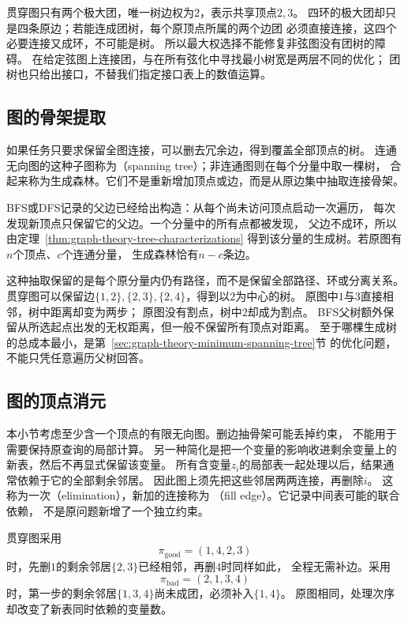 贯穿图只有两个极大团，唯一树边权为\(2\)，表示共享顶点\(2,3\)。
四环的极大团却只是四条原边；若能连成团树，每个原顶点所属的两个边团
必须直接连接，这四个必要连接又成环，不可能是树。
所以最大权选择不能修复非弦图没有团树的障碍。
在给定弦图上连接团，与在所有弦化中寻找最小树宽是两层不同的优化；
团树也只给出接口，不替我们指定接口表上的数值运算。

\subsection{图的骨架提取}
\label{sec:graph-theory-spanning-skeleton}

如果任务只要求保留全图连接，可以删去冗余边，得到覆盖全部顶点的树。
连通无向图的这种子图称为（spanning tree）；非连通图则在每个分量中取一棵树，
合起来称为生成森林。它们不是重新增加顶点或边，而是从原边集中抽取连接骨架。

BFS或DFS记录的父边已经给出构造：从每个尚未访问顶点启动一次遍历，
每次发现新顶点只保留它的父边。一个分量中的所有点都被发现，
父边不成环，所以由定理~\ref{thm:graph-theory-tree-characterizations}
得到该分量的生成树。若原图有\(n\)个顶点、\(c\)个连通分量，
生成森林恰有\(n-c\)条边。

这种抽取保留的是每个原分量内仍有路径，而不是保留全部路径、环或分离关系。
贯穿图可以保留边\(\{1,2\},\{2,3\},\{2,4\}\)，得到以\(2\)为中心的树。
原图中\(1\)与\(3\)直接相邻，树中距离却变为两步；
原图没有割点，树中\(2\)却成为割点。
BFS父树额外保留从所选起点出发的无权距离，但一般不保留所有顶点对距离。
至于哪棵生成树的总成本最小，是第~\ref{sec:graph-theory-minimum-spanning-tree}节
的优化问题，不能只凭任意遍历父树回答。

\subsection{图的顶点消元}
\label{sec:graph-theory-elimination-width}

本小节考虑至少含一个顶点的有限无向图。删边抽骨架可能丢掉约束，
不能用于需要保持原查询的局部计算。
另一种简化是把一个变量的影响收进剩余变量上的新表，然后不再显式保留该变量。
所有含变量\(z_i\)的局部表一起处理以后，结果通常依赖于它的全部剩余邻居。
因此图上须先把这些邻居两两连接，再删除\(i\)。
这称为一次（elimination），新加的连接称为
（fill edge）。它记录中间表可能的联合依赖，
不是原问题新增了一个独立约束。

贯穿图采用
\[
  \pi_{\mathrm{good}}=(1,4,2,3)
\]
时，先删\(1\)的剩余邻居\(\{2,3\}\)已经相邻，再删\(4\)时同样如此，
全程无需补边。采用
\[
  \pi_{\mathrm{bad}}=(2,1,3,4)
\]
时，第一步的剩余邻居\(\{1,3,4\}\)尚未成团，必须补入\(\{1,4\}\)。
原图相同，处理次序却改变了新表同时依赖的变量数。

